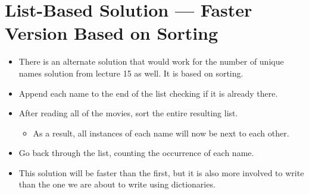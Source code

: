 \documentclass[letterpaper,10pt,english]{sphinxmanual}
\begin{document}
\section{List-Based Solution — Faster Version Based on Sorting}
\label{\detokenize{lecture_notes/lec16_dictionaries1:list-based-solution-faster-version-based-on-sorting}}\begin{itemize}
\item {} 
There is an alternate solution that would work for the number of unique names solution from
lecture 15 as well. It is based on sorting.

\item {} 
Append each name to the end of the list  checking if it is
already there.

\item {} 
After reading all of the movies, sort the entire resulting list.
\begin{itemize}
\item {} 
As a result, all instances of each name will now be next to each
other.

\end{itemize}

\item {} 
Go back through the list, counting the occurrence of each name.

\item {} 
This solution will be  faster than the first, but it is also
more involved to write than the one we are about to write using
dictionaries.

\end{itemize}
\end{document}
